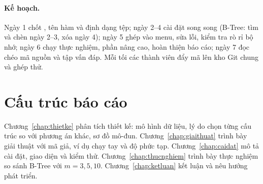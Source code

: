 \paragraph{Kế hoạch.} Ngày 1 chốt , tên hàm và định dạng tệp; ngày 2--4 cài đặt song song
(B-Tree: tìm và chèn ngày 2--3, xóa ngày 4); ngày 5 ghép vào menu, sửa lỗi, kiểm tra rò rỉ bộ nhớ;
ngày 6 chạy thực nghiệm, phần nâng cao, hoàn thiện báo cáo; ngày 7 đọc chéo mã nguồn và tập vấn đáp.
Mỗi tối các thành viên đẩy mã lên kho Git chung và ghép thử.

\section{Cấu trúc báo cáo}

Chương~\ref{chap:thietke} phân tích thiết kế: mô hình dữ liệu, lý do chọn từng cấu trúc so với phương án khác,
sơ đồ mô-đun. Chương~\ref{chap:giaithuat} trình bày giải thuật với mã giả, ví dụ chạy tay và độ phức tạp.
Chương~\ref{chap:caidat} mô tả cài đặt, giao diện và kiểm thử. Chương~\ref{chap:thucnghiem} trình bày thực
nghiệm so sánh B-Tree với $m = 3, 5, 10$. Chương~\ref{chap:ketluan} kết luận và nêu hướng phát triển.
